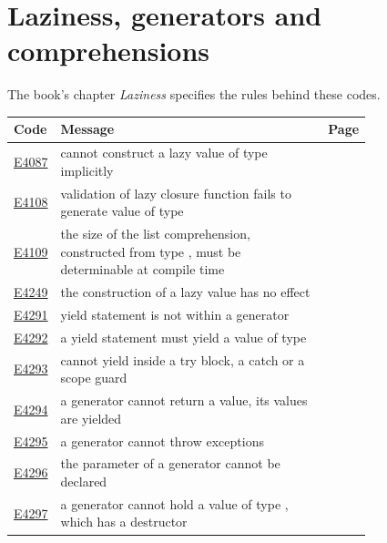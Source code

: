 
\clearpage
\section{Laziness, generators and comprehensions}
\label{sec:codes:lazy}

The book's chapter \textit{Laziness} specifies the rules behind these codes.

\begin{longtable}{@{}l p{0.78\linewidth} r@{}}
\toprule Code & Message & Page\\ \midrule \endhead
\hyperref[sec:codes:e4087]{E4087} & cannot construct a lazy value of type \errhole{} implicitly & \pageref{sec:codes:e4087}\\
\hyperref[sec:codes:e4108]{E4108} & validation of lazy closure function fails to generate value of type \errhole{} & \pageref{sec:codes:e4108}\\
\hyperref[sec:codes:e4109]{E4109} & the size of the list comprehension, constructed from type \errhole{}, must be determinable at compile time & \pageref{sec:codes:e4109}\\
\hyperref[sec:codes:e4249]{E4249} & the construction of a lazy value has no effect & \pageref{sec:codes:e4249}\\
\hyperref[sec:codes:e4291]{E4291} & yield statement is not within a generator & \pageref{sec:codes:e4291}\\
\hyperref[sec:codes:e4292]{E4292} & a yield statement must yield a value of type \errhole{} & \pageref{sec:codes:e4292}\\
\hyperref[sec:codes:e4293]{E4293} & cannot yield inside a try block, a catch or a scope guard & \pageref{sec:codes:e4293}\\
\hyperref[sec:codes:e4294]{E4294} & a generator cannot return a value, its values are yielded & \pageref{sec:codes:e4294}\\
\hyperref[sec:codes:e4295]{E4295} & a generator cannot throw exceptions & \pageref{sec:codes:e4295}\\
\hyperref[sec:codes:e4296]{E4296} & the parameter \errhole{} of a generator cannot be declared \errhole{} & \pageref{sec:codes:e4296}\\
\hyperref[sec:codes:e4297]{E4297} & a generator cannot hold a value of type \errhole{}, which has a destructor & \pageref{sec:codes:e4297}\\

\end{longtable}
